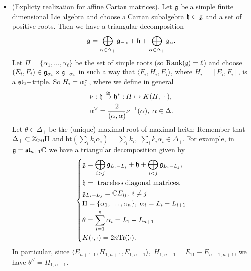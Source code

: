 \begin{itemize}
    subalgebra. We will show that $\widetilde{g}$ is an affine Kac moody algebra.
    \item(Explicty realization for affine Cartan matrices). Let $\mathfrak{g}$ be a simple finite dimensional Lie algebra and choose 
    a Cartan subalgebra $\mathfrak{h}\subset \mathfrak{g}$ and a set of positive roots. Then we have a triangular decomposition 
    \begin{equation}
        \mathfrak{g} = \bigoplus_{\alpha\in\Delta_+}\mathfrak{g}_{-\alpha}+\mathfrak{h}+\bigoplus_{\alpha\in\Delta_+}\mathfrak{g}_\alpha.
    \end{equation}
    Let $\Pi =\{\alpha_1,\dots,\alpha_\ell\}$ be the set of simple roots (so $\text{Rank}(\mathfrak{g})=\ell$) and choose 
    $(E_i,F_i)\in\mathfrak{g}_{\alpha_i}\times\mathfrak{g}_{-\alpha_i}$ in such a way that $\langle F_i, H_i, E_i \rangle$, where 
    $H_i=[E_i,F_i]$, is a $\mathfrak{sl}_2-$triple. So $H_i = \alpha^{\vee}_i$, where we define in general 
    \begin{equation}\label{equation: coroots definition}
        \begin{aligned}
            &\nu :\mathfrak{h}\overset{\cong}{\to}\mathfrak{h}^*:H\mapsto K(H,\;\cdot\;),\\
            &\alpha^\vee = \frac{2}{(\alpha,\alpha)}\nu^{-1}(\alpha),\;\alpha\in\Delta.
        \end{aligned}
    \end{equation} 
    Let $\theta\in\Delta_+$ be the (unique) maximal root of maximal heith: Remember that $\Delta_+\subset\mathbb{Z}_{\geq0}\Pi$ and 
    $\text{ht}(\sum_ik_i\alpha_i)=\sum_ik_i,\; \sum_ik_i\alpha_i\in\Delta_+$. For example, in $\mathfrak{g}=\mathfrak{sl}_{n+1}\mathbb{C}$
    we have a triangular decomposition given by 
    \begin{equation}
        \left\{\begin{aligned}
            &\mathfrak{g} = \bigoplus_{i>j}\mathfrak{g}_{L_i - L_j} + \mathfrak{h} + \bigoplus_{i < j}\mathfrak{g}_{L_i - L_j},\\
            &\mathfrak{h} = \text{ traceless diagonal matrices},\\
            &\mathfrak{g}_{L_i - L_j} = \mathbb{C} E_{ij},\;i\neq j\\
            &\Pi = \{\alpha_1,\dots,\alpha_n\},\;\alpha_i = L_i - L_{i+1}\\
            &\theta = \sum_{i=1}^n \alpha_i = L_1 - L_{n+1}\\
            &K(\cdot,\cdot) = 2n\text{Tr}(\dot,\cdot).
        \end{aligned}\right.
    \end{equation}
    In particular, since $\langle E_{n+1,1}, H_{1,n+1}, E_{1,n+1} \rangle,\; H_{1,n+1}= E_{11} - E_{n+1,n+1}$, we have 
    $\theta^\vee = H_{1,n+1}$.\par 


\end{itemize}
